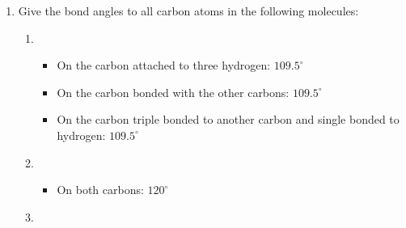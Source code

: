 \documentclass[12pt]{article}
\begin{document}
\begin{enumerate}
\begin{enumerate}
      \item {}

        \vspace{5pt}
        \begin{multicols}{2}
          \hspace{110pt}\hspace{20pt}
          The molecular structure is most likely \underline{Tri-bipyramid}. The bond angles are $120^{\circ}$ between  and  and $180^{\circ}$ between  and . The compound is non-polar.
      \end{multicols}
        \vspace{5pt}

    \end{enumerate}
\newpage
  \item Give the bond angles to all carbon atoms in the following molecules:

    \begin{enumerate}

      \item {}

        \begin{itemize}

          \item On the carbon attached to three hydrogen: $109.5^{\circ}$ 

          \item On the carbon bonded with the other carbons: $109.5^{\circ}$

          \item On the carbon triple bonded to another carbon and single bonded to hydrogen: $109.5^{\circ}$

        \end{itemize}

      \item {}

        \begin{itemize}

          \item On both carbons: $120^{\circ}$

        \end{itemize}

      \item {}

        \begin{itemize}


\end{itemize}
\end{enumerate}
\end{enumerate}
\end{document}
